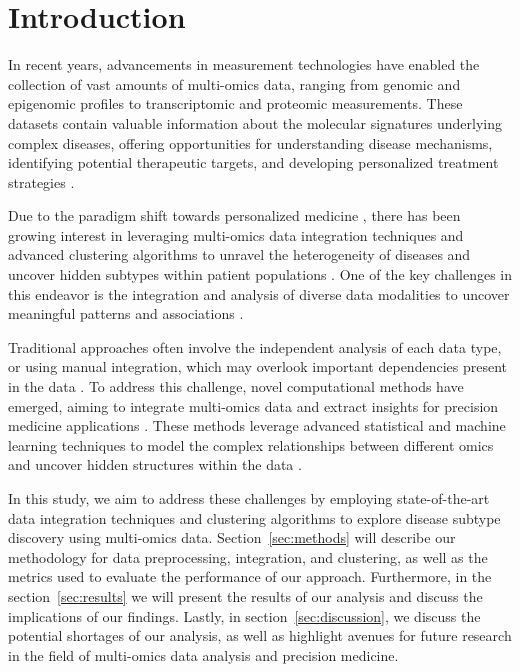 
\section{Introduction}

In recent years, advancements in measurement technologies have enabled the collection of vast amounts of multi-omics data, ranging from genomic and epigenomic profiles to transcriptomic and proteomic measurements. These datasets contain valuable information about the molecular signatures underlying complex diseases, offering opportunities for understanding disease mechanisms, identifying potential therapeutic targets, and developing personalized treatment strategies \cite{konig2017precision}.

Due to the paradigm shift towards personalized medicine \cite{aronson2015building}, there has been growing interest in leveraging multi-omics data integration techniques and advanced clustering algorithms to unravel the heterogeneity of diseases and uncover hidden subtypes within patient populations \cite{gliozzo2022heterogeneous}. One of the key challenges in this endeavor is the integration and analysis of diverse data modalities to uncover meaningful patterns and associations \cite{shen2009integrative, wang2014similarity}.

Traditional approaches often involve the independent analysis of each data type, or using manual integration, which may overlook important dependencies present in the data \cite{wang2014similarity, gliozzo2022heterogeneous}. To address this challenge, novel computational methods have emerged, aiming to integrate multi-omics data and extract insights for precision medicine applications \cite{nicora2020integrated}. These methods leverage advanced statistical and machine learning techniques to model the complex relationships between different omics and uncover hidden structures within the data \cite{gliozzo2022heterogeneous}.

In this study, we aim to address these challenges by employing state-of-the-art data integration techniques and clustering algorithms to explore disease subtype discovery using multi-omics data. Section~\ref{sec:methods} will describe our methodology for data preprocessing, integration, and clustering, as well as the metrics used to evaluate the performance of our approach. Furthermore, in the section~\ref{sec:results} we will present the results of our analysis and discuss the implications of our findings. Lastly, in section~\ref{sec:discussion}, we discuss the potential shortages of our analysis, as well as highlight avenues for future research in the field of multi-omics data analysis and precision medicine.
